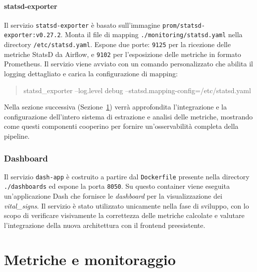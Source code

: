 \paragraph{statsd-exporter}
Il servizio \texttt{statsd-exporter} è basato sull’immagine \texttt{prom/statsd-exporter:v0.27.2}.  
Monta il file di mapping \texttt{./monitoring/statsd.yaml} nella directory \texttt{/etc/statsd.yaml}.  
Espone due porte: \texttt{9125} per la ricezione delle metriche StatsD da Airflow, e \texttt{9102} per l’esposizione delle metriche in formato Prometheus.  
Il servizio viene avviato con un comando personalizzato che abilita il logging dettagliato e carica la configurazione di mapping:
\begin{quote}\ttfamily
statsd\_exporter --log.level debug --statsd.mapping-config=/etc/statsd.yaml
\end{quote}

Nella sezione successiva (Sezione~\ref{sec:implmonitoring}) verrà approfondita l’integrazione e la configurazione dell’intero sistema di estrazione e analisi delle metriche, mostrando come questi componenti cooperino per fornire un’osservabilità completa della pipeline.


\subsubsection{Dashboard}

Il servizio \texttt{dash-app} è costruito a partire dal \texttt{Dockerfile} presente nella directory \texttt{./dashboards} ed espone la porta \texttt{8050}.  
Su questo container viene eseguita un’applicazione Dash che fornisce le \emph{dashboard} per la visualizzazione dei \textit{vital\_signs}.  
Il servizio è stato utilizzato unicamente nella fase di sviluppo, con lo scopo di verificare visivamente la correttezza delle metriche calcolate e valutare l’integrazione della nuova architettura con il frontend preesistente.  

\section{Metriche e monitoraggio}
\label{sec:implmonitoring}

\clearpage
